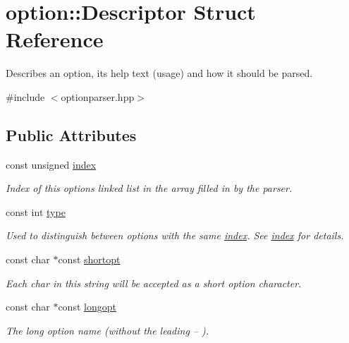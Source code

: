 \hypertarget{structoption_1_1Descriptor}{}\section{option\+:\+:Descriptor Struct Reference}
\label{structoption_1_1Descriptor}


Describes an option, its help text (usage) and how it should be parsed.  




{\ttfamily \#include $<$optionparser.\+hpp$>$}

\subsection*{Public Attributes}
\begin{DoxyCompactItemize}
\item 
const unsigned \hyperlink{structoption_1_1Descriptor_a1fee8ac44f529c99ac2b1149b4c391b1}{index}
\begin{DoxyCompactList}\small\item\em Index of this option\textquotesingle{}s linked list in the array filled in by the parser. \end{DoxyCompactList}\item 
const int \hyperlink{structoption_1_1Descriptor_a1b220dabd8aad075fa441a80f9b9343c}{type}
\begin{DoxyCompactList}\small\item\em Used to distinguish between options with the same \hyperlink{structoption_1_1Descriptor_a1fee8ac44f529c99ac2b1149b4c391b1}{index}. See \hyperlink{structoption_1_1Descriptor_a1fee8ac44f529c99ac2b1149b4c391b1}{index} for details. \end{DoxyCompactList}\item 
const char $\ast$const \hyperlink{structoption_1_1Descriptor_a0dba4ccca59c19d6ed4081391fca5adb}{shortopt}
\begin{DoxyCompactList}\small\item\em Each char in this string will be accepted as a short option character. \end{DoxyCompactList}\item 
const char $\ast$const \hyperlink{structoption_1_1Descriptor_a470c449dfa894c9bfda2dae026142b4b}{longopt}
\begin{DoxyCompactList}\small\item\em The long option name (without the leading {\ttfamily --} ). \end{DoxyCompactList}\item 

\end{DoxyCompactItemize}

